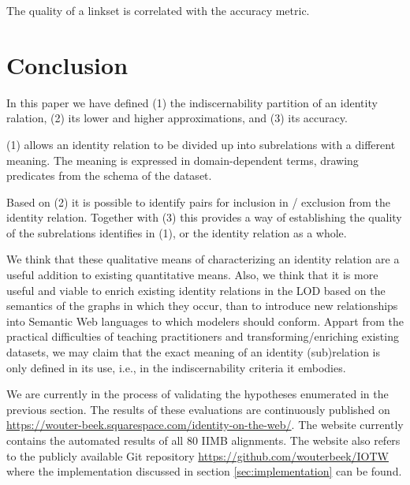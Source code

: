 \documentclass[letterpaper]{article}
\begin{document}
The quality of a linkset is correlated with the accuracy metric.

\section{Conclusion}
\label{sec:conclusion}

In this paper we have defined (1) the indiscernability partition of an identity ralation, (2) its lower and higher approximations, and (3) its accuracy.

(1) allows an identity relation to be divided up into subrelations with a different meaning. The meaning is expressed in domain-dependent terms, drawing predicates from the schema of the dataset.

Based on (2) it is possible to identify pairs for inclusion in / exclusion from the identity relation. Together with (3) this provides a way of establishing the quality of the subrelations identifies in (1), or the identity relation as a whole.

We think that these qualitative means of characterizing an identity relation are a useful addition to existing quantitative means. Also, we think that it is more useful and viable to enrich existing identity relations in the LOD based on the semantics of the graphs in which they occur, than to introduce new relationships into Semantic Web languages to which modelers should conform. Appart from the practical difficulties of teaching practitioners and transforming/enriching existing datasets, we may claim that the exact meaning of an identity (sub)relation is only defined in its use, i.e., in the indiscernability criteria it embodies.

We are currently in the process of validating the hypotheses enumerated in the previous section. The results of these evaluations are continuously published on \url{https://wouter-beek.squarespace.com/identity-on-the-web/}. The website currently contains the automated results of all 80 IIMB alignments. The website also refers to the publicly available Git repository \url{https://github.com/wouterbeek/IOTW} where the implementation discussed in section \ref{sec:implementation} can be found.



\end{document}
